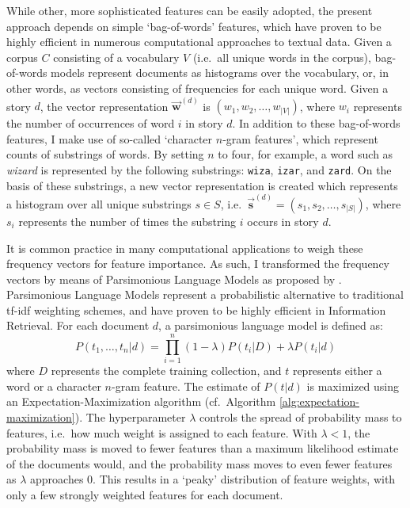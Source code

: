 While other, more sophisticated features can be easily adopted, the present approach depends on simple `bag-of-words' features, which have proven to be highly efficient in numerous computational approaches to textual data. Given a corpus $C$ consisting of a vocabulary $V$ (i.e.\ all unique words in the corpus), bag-of-words models represent documents as histograms over the vocabulary, or, in other words, as vectors consisting of frequencies for each unique word. Given a story $d$, the vector representation $\vec{\mathbf{w}}^{(d)}$ is $(w_1, w_2, \ldots, w_{|V|})$, where $w_i$ represents the number of occurrences of word $i$ in story $d$. In addition to these bag-of-words features, I make use of so-called `character $n$-gram features', which represent counts of substrings of words. By setting $n$ to four, for example, a word such as \emph{wizard} is represented by the following substrings: \texttt{wiza}, \texttt{izar}, and \texttt{zard}. On the basis of these substrings, a new vector representation is created which represents a histogram over all unique substrings $s \in S$, i.e.\ $\vec{\mathbf{s}}^{(d)} = (s_1, s_2, \ldots, s_{|S|})$, where $s_i$ represents the number of times the substring $i$ occurs in story $d$.

It is common practice in many computational applications to weigh these frequency vectors for feature importance. As such, I transformed the frequency vectors by means of Parsimonious Language Models as proposed by \citeauthor{hiemstra:2004}.\autocite{hiemstra:2004} Parsimonious Language Models represent a probabilistic alternative to traditional tf-idf weighting schemes\autocite{manning:2008}, and have proven to be highly efficient in Information Retrieval. For each document $d$, a parsimonious language model is defined as:
\begin{equation}
P(t_1,\ldots,t_n|d) = \prod^n_{i=1} (1 - \lambda) P(t_i|D) + \lambda P(t_i|d)
\end{equation}
where $D$ represents the complete training collection, and $t$ represents either a word or a character $n$-gram feature. The estimate of $P(t|d)$ is maximized using an Expectation-Maximization algorithm (cf.\ Algorithm \ref{alg:expectation-maximization}). The hyperparameter $\lambda$ controls the spread of probability mass to features, i.e.\ how much weight is assigned to each feature. With $\lambda < 1$, the probability mass is moved to fewer features than a maximum likelihood estimate of the documents would, and the probability mass moves to even fewer features as $\lambda$ approaches 0. This results in a `peaky' distribution of feature weights, with only a few strongly weighted features for each document.

